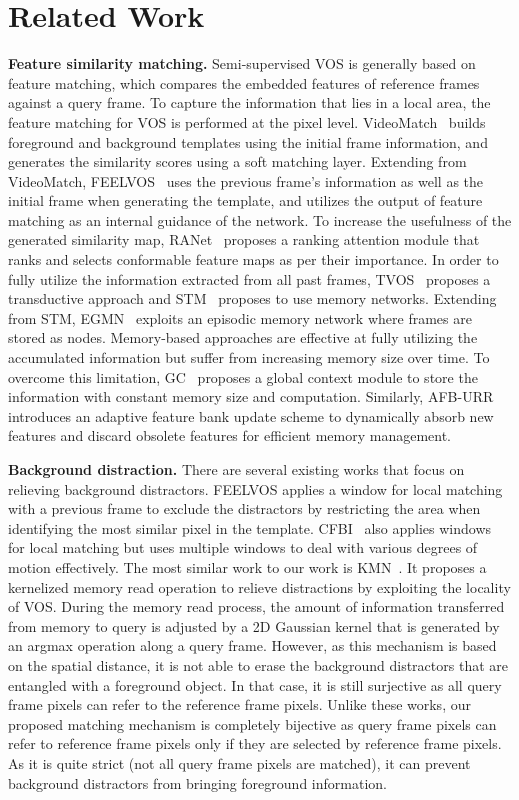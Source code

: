 \documentclass[10pt,twocolumn,letterpaper]{article}
\begin{document}
	
	
	
	\section{Related Work}
	\noindent\textbf{Feature similarity matching.} Semi-supervised VOS is generally based on feature matching, which compares the embedded features of reference frames against a query frame. To capture the information that lies in a local area, the feature matching for VOS is performed at the pixel level. VideoMatch~\cite{VideoMatch} builds foreground and background templates using the initial frame information, and generates the similarity scores using a soft matching layer. Extending from VideoMatch, FEELVOS~\cite{FEELVOS} uses the previous frame's information as well as the initial frame when generating the template, and utilizes the output of feature matching as an internal guidance of the network. To increase the usefulness of the generated similarity map, RANet~\cite{RANet} proposes a ranking attention module that ranks and selects conformable feature maps as per their importance. In order to fully utilize the information extracted from all past frames, TVOS~\cite{TVOS} proposes a transductive approach and STM~\cite{STM} proposes to use memory networks. Extending from STM, EGMN~\cite{EGMN} exploits an episodic memory network where frames are stored as nodes. Memory-based approaches are effective at fully utilizing the accumulated information but suffer from increasing memory size over time. To overcome this limitation, GC~\cite{GC} proposes a global context module to store the information with constant memory size and computation. Similarly, AFB-URR~\cite{AFB-URR} introduces an adaptive feature bank update scheme to dynamically absorb new features and discard obsolete features for efficient memory management. 
	
	\vspace{1mm}
	\noindent\textbf{Background distraction.} There are several existing works that focus on relieving background distractors. FEELVOS applies a window for local matching with a previous frame to exclude the distractors by restricting the area when identifying the most similar pixel in the template. CFBI~\cite{CFBI} also applies windows for local matching but uses multiple windows to deal with various degrees of motion effectively. The most similar work to our work is KMN~\cite{KMN}. It proposes a kernelized memory read operation to relieve distractions by exploiting the locality of VOS. During the memory read process, the amount of information transferred from memory to query is adjusted by a 2D Gaussian kernel that is generated by an argmax operation along a query frame. However, as this mechanism is based on the spatial distance, it is not able to erase the background distractors that are entangled with a foreground object. In that case, it is still surjective as all query frame pixels can refer to the reference frame pixels. Unlike these works, our proposed matching mechanism is completely bijective as query frame pixels can refer to reference frame pixels only if they are selected by reference frame pixels. As it is quite strict (not all query frame pixels are matched), it can prevent background distractors from bringing foreground information.
	
\end{document}
